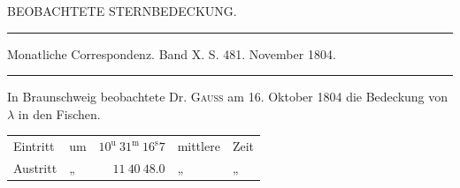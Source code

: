 \begin{center}
BEOBACHTETE STERNBEDECKUNG.
\end{center}

\begin{center}
\rule{0.6\linewidth}{0.4pt}

Monatliche Correspondenz. Band X. S. 481. November 1804.

\rule{0.6\linewidth}{0.4pt}
\end{center}

In Braunschweig beobachtete Dr. \textsc{Gauss} am 16. Oktober 1804 die Bedeckung von $\lambda$ in den Fischen.

\begin{center}
\begingroup\fontsize{10}{12}\selectfont\setlength{\tabcolsep}{3pt}\renewcommand{\arraystretch}{1.1}
\begin{tabular}{llrll}
Eintritt & um & $10^{\mathrm u}\ 31^{\mathrm m}\ 16^{\mathrm s}7$ & mittlere & Zeit \\
Austritt & „ & $11\ 40\ 48.0$ & „ & „ \\
\end{tabular}\endgroup
\end{center}
